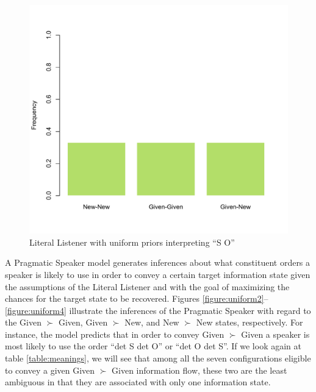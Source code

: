 \documentclass[output=paper,modfonts,nonflat]{langsci/langscibook}
\begin{document}
\begin{figure}
\includegraphics[scale = 0.4]{figures/plotLiteralListenerSbjObjUniform}
\caption{Literal Listener with uniform priors interpreting ``S O''}\label{figure:uniform1}
\end{figure}

A Pragmatic Speaker model generates inferences about what constituent orders a speaker is likely to use in order to convey a certain target information state given the assumptions of the Literal Listener and with the goal of maximizing the chances for the target state to be recovered. Figures \ref{figure:uniform2}--\ref{figure:uniform4} illustrate the inferences of the Pragmatic Speaker with regard to the Given $\succ$ Given, Given $\succ$ New, and New $\succ$ New states, respectively. For instance, the model predicts that in order to convey Given $\succ$ Given a speaker is most likely to use the order ``{\sc det} S {\sc det} O'' or ``{\sc det} O {\sc det} S''. If we look again at table \ref{table:meanings}, we will see that among all the seven configurations eligible to convey a given Given $\succ$ Given information flow, these two are the least ambiguous in that they are associated with only one information state.
\end{document}
